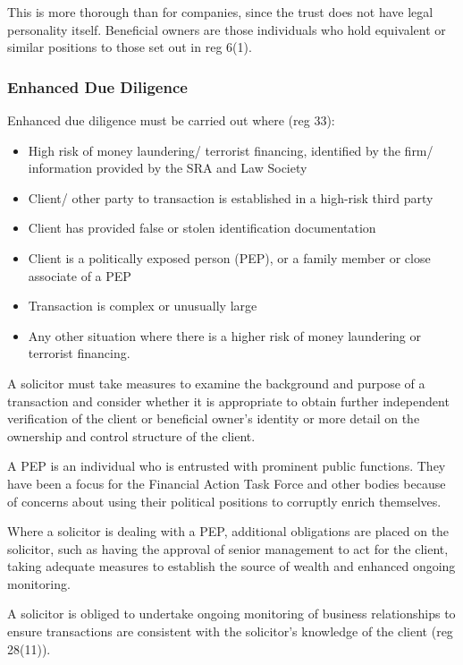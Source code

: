 \documentclass[
]{article}
\providecommand{\tightlist}{%
  \setlength{\itemsep}{0pt}\setlength{\parskip}{0pt}}
\begin{document}
This is more thorough than for companies, since the trust does not have
legal personality itself. Beneficial owners are those individuals who
hold equivalent or similar positions to those set out in reg 6(1).

\hypertarget{enhanced-due-diligence}{%
\subsubsection{Enhanced Due Diligence}\label{enhanced-due-diligence}}

Enhanced due diligence must be carried out where (reg 33):

\begin{itemize}
\tightlist
\item
  High risk of money laundering/ terrorist financing, identified by the
  firm/ information provided by the SRA and Law Society
\item
  Client/ other party to transaction is established in a high-risk third
  party
\item
  Client has provided false or stolen identification documentation
\item
  Client is a politically exposed person (PEP), or a family member or
  close associate of a PEP
\item
  Transaction is complex or unusually large
\item
  Any other situation where there is a higher risk of money laundering
  or terrorist financing.
\end{itemize}

A solicitor must take measures to examine the background and purpose of
a transaction and consider whether it is appropriate to obtain further
independent verification of the client or beneficial owner's identity or
more detail on the ownership and control structure of the client.

A PEP is an individual who is entrusted with prominent public functions.
They have been a focus for the Financial Action Task Force and other
bodies because of concerns about using their political positions to
corruptly enrich themselves.

Where a solicitor is dealing with a PEP, additional obligations are
placed on the solicitor, such as having the approval of senior
management to act for the client, taking adequate measures to establish
the source of wealth and enhanced ongoing monitoring.

A solicitor is obliged to undertake ongoing monitoring of business
relationships to ensure transactions are consistent with the solicitor's
knowledge of the client (reg 28(11)).
\end{document}
